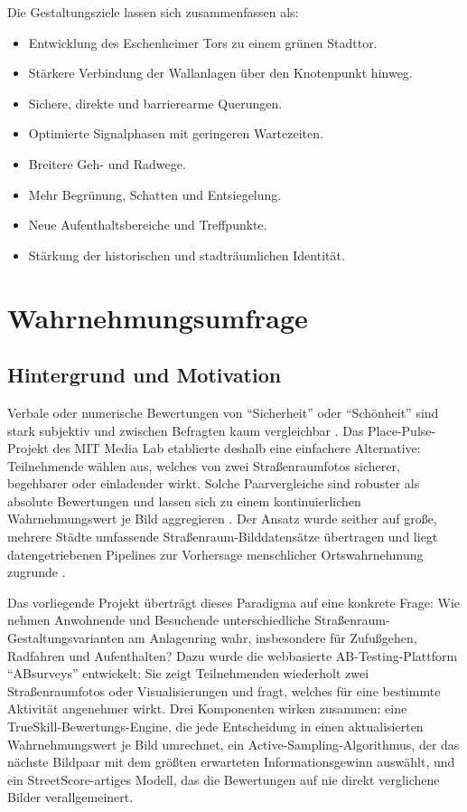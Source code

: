 \documentclass[a4paper,12pt]{article}
\begin{document}
Die Gestaltungsziele lassen sich zusammenfassen als:

\begin{itemize}
	\item Entwicklung des Eschenheimer Tors zu einem grünen Stadttor.
	\item Stärkere Verbindung der Wallanlagen über den Knotenpunkt hinweg.
	\item Sichere, direkte und barrierearme Querungen.
	\item Optimierte Signalphasen mit geringeren Wartezeiten.
	\item Breitere Geh- und Radwege.
	\item Mehr Begrünung, Schatten und Entsiegelung.
	\item Neue Aufenthaltsbereiche und Treffpunkte.
	\item Stärkung der historischen und stadträumlichen Identität.
\end{itemize}


\section{Wahrnehmungsumfrage}
\label{sec:wahrnehmungsumfrage}

\subsection{Hintergrund und Motivation}

Verbale oder numerische Bewertungen von \enquote{Sicherheit} oder \enquote{Schönheit} sind stark subjektiv und zwischen Befragten kaum vergleichbar \autocite{salesses2013}. Das Place-Pulse-Projekt des MIT Media Lab etablierte deshalb eine einfachere Alternative: Teilnehmende wählen aus, welches von zwei Straßenraumfotos sicherer, begehbarer oder einladender wirkt. Solche Paarvergleiche sind robuster als absolute Bewertungen und lassen sich zu einem kontinuierlichen Wahrnehmungswert je Bild aggregieren \autocite{salesses2013,naik2014}. Der Ansatz wurde seither auf große, mehrere Städte umfassende Straßenraum-Bilddatensätze übertragen und liegt datengetriebenen Pipelines zur Vorhersage menschlicher Ortswahrnehmung zugrunde \autocite{hou2024,zhang2018}.

Das vorliegende Projekt überträgt dieses Paradigma auf eine konkrete Frage: Wie nehmen Anwohnende und Besuchende unterschiedliche Straßenraum-Gestaltungsvarianten am Anlagenring wahr, insbesondere für Zufußgehen, Radfahren und Aufenthalten? Dazu wurde die webbasierte AB-Testing-Plattform \enquote{ABsurveys} entwickelt: Sie zeigt Teilnehmenden wiederholt zwei Straßenraumfotos oder Visualisierungen und fragt, welches für eine bestimmte Aktivität angenehmer wirkt. Drei Komponenten wirken zusammen: eine TrueSkill-Bewertungs-Engine, die jede Entscheidung in einen aktualisierten Wahrnehmungswert je Bild umrechnet, ein Active-Sampling-Algorithmus, der das nächste Bildpaar mit dem größten erwarteten Informationsgewinn auswählt, und ein StreetScore-artiges Modell, das die Bewertungen auf nie direkt verglichene Bilder verallgemeinert.
\end{document}

